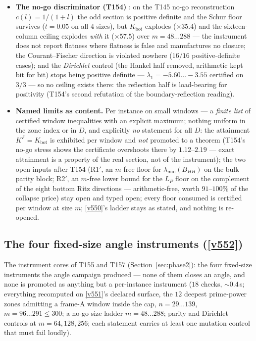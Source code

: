 \documentclass[11pt,a4paper]{article}
\begin{document}
\begin{itemize}[leftmargin=1.5em]
of $A-\gamma I$ (size $m$, certified, not fixed size, labelled as such): the price is a
uniformity gap, not a size gap. Control: $A=L_P$ through the same instrument returns
$K_{\mathrm{bot}}=K^F=1$ and zero misalignment (deviations $<10^{-5}$, the inertia
ladder's backoff step), with the price exactly $1/t$.
\item \textbf{The no-go discriminator (T154)} \mE: on the T145 no-go reconstruction
$c(l)=1/(1+l)$ the odd section is positive definite and the Schur floor survives
($t=0.05$ on all $4$ sizes), but $K_{\mathrm{bot}}$ explodes ($\times35.4$) and the
sixteen-column ceiling explodes \emph{with} it ($\times57.5$) over $m=48\ldots288$ ---
the instrument does not report flatness where flatness is false and manufactures no
closure; the Courant--Fischer direction is violated nowhere ($16/16$ positive-definite
cases); and the \emph{Dirichlet} control (the Hankel half removed, arithmetic kept bit
for bit) stops being positive definite --- $\lambda_1=-5.60\ldots-3.55$ certified on
$3/3$ --- so no ceiling exists there: the reflection half is load-bearing for positivity
(T154's second refutation of the boundary-reflection reading).
\item \textbf{Named limits as content.} Per instance on small windows --- a \emph{finite
list} of certified window inequalities with an explicit maximum; nothing uniform in the
zone index or in $D$, and explicitly \emph{no} statement for all $D$: the attainment
$K^F=K_{\mathrm{bot}}$ is exhibited per window and \emph{not} promoted to a theorem
(T154's no-go stress shows the certificate overshoots there by $1.12$--$2.19$ --- exact
attainment is a property of the real section, not of the instrument); the two open
inputs after T154 (R1$'$, an $m$-free floor for $\lambda_{\min}(B_{HH})$ on the bulk
parity block; R2$'$, an $m$-free lower bound for the $L_P$ floor on the complement of
the eight bottom Ritz directions --- arithmetic-free, worth $91$--$100\%$ of the
collapse price) stay open and typed open; every floor consumed is certified per window
at size $m$; \vref{v550}'s ladder stays as stated, and nothing is re-opened.
\end{itemize}

\subsection{The four fixed-size angle instruments (\texorpdfstring{\vref{v552}}{v552})}\label{sec:v552}
The instrument cores of T155 and T157 (Section~\ref{sec:phase2}): the four fixed-size
instruments the angle campaign produced --- none of them closes an angle, and none is
promoted as anything but a per-instance instrument
 ($18$ checks, ${\sim}0.4$\,s; everything recomputed on
\vref{v551}'s declared surface, the $12$ deepest prime-power zones admitting a frame-A
window inside the cap, $n=29\ldots139$, $m=96\ldots291\le300$; a no-go size ladder
$m=48\ldots288$; parity and Dirichlet controls at $m=64,128,256$; each statement carries
at least one mutation control that must fail loudly).
\end{document}
